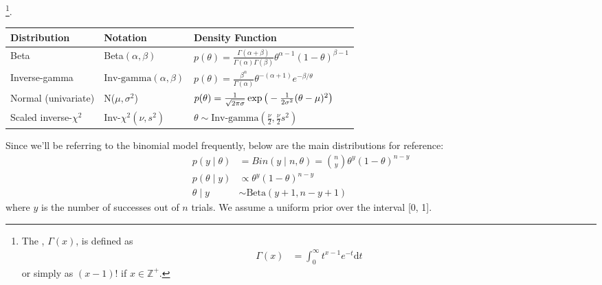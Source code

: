 \documentclass[11pt]{article}
\begin{document}
\myspace
\p {}\footnote{The , $\Gamma(x)$, is defined as 
	\begin{align}
		\Gamma(x) &= \int_0^\infty t^{x - 1} e^{-t} \mathrm{d}t
	\end{align}
or simply as $(x - 1)!$ if $x \in \mathbb{Z}^+$. }. 
\begin{table*}[h!]
	\centering
	\begin{tabular}{l l l}
		\toprule
		Distribution & Notation & Density Function \\ \midrule
		Beta & Beta$(\alpha, \beta)$ & $p(\theta) = \tfrac{\Gamma(\alpha + \beta)}{ \Gamma(\alpha)\Gamma(\beta) } \theta^{\alpha - 1}(1 - \theta)^{\beta -1}$  \\ 
		Inverse-gamma & $\text{Inv-gamma}(\alpha, \beta)$	& $p(\theta) = \tfrac{\beta^\alpha}{\Gamma(\alpha)}\theta^{-(\alpha + 1)} e^{-\beta/\theta}  $   \\	
		Normal (univariate) & N($\mu, \sigma^2$) & $p(\theta) = \frac{1}{\sqrt{2 \pi \sigma}} \exp\big( - \frac{1}{2\sigma^2} (\theta - \mu)^2  \big)$ \\
		Scaled inverse-$\chi^2$ & Inv-$\chi^2(\nu, s^2)$  &  $\theta \sim \text{Inv-gamma}(\tfrac{\nu}{2}, \tfrac{\nu}{2}s^2)$ \\
		\bottomrule
	\end{tabular}
	\label{table:distributions}
\end{table*}




\p Since we'll be referring to the binomial model frequently, below are the main distributions for reference:
\begin{align}
	p(y \mid \theta) &= Bin(y \mid n, \theta) = \binom{n}{y} \theta^y (1 - \theta)^{n - y} \\
	p(\theta \mid y) &\propto \theta^y (1 - \theta)^{n - y} \\
	\theta \mid y &\sim \text{Beta}(y + 1, n - y + 1) 
\end{align}
where $y$ is the number of successes out of $n$ trials. We assume a uniform prior over the interval [0, 1]. 
\end{document}
